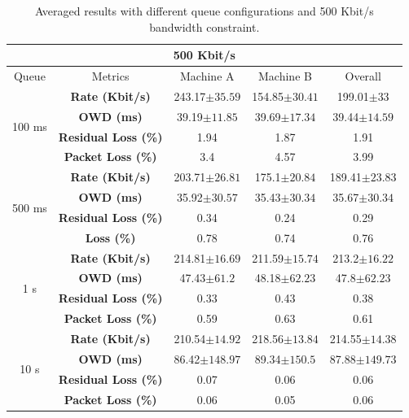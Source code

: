 \begin{table}[h]
\begin{center}
\begin{tabular}{ |c|c|c|c|c| }
\hline
\multicolumn{5}{|c|}{\textbf{500 Kbit/s}} \\ \hline
 Queue & Metrics & Machine A & Machine B & Overall\\ \hline
\multirow{4}{*}{100 ms} & \textbf{Rate (Kbit/s)} & 243.17$\pm35.59$ & 154.85$\pm30.41$ & 199.01$\pm33$\\ \cline{2-5}
 & \textbf{OWD (ms)} &  39.19$\pm11.85$ & 39.69$\pm17.34$ & 39.44$\pm14.59$ \\ \cline{2-5}
 & \textbf{Residual Loss (\%)} & 1.94 & 1.87 & 1.91 \\ \cline{2-5}
 & \textbf{Packet Loss (\%)} & 3.4 & 4.57 & 3.99 \\ \hline
\multirow{4}{*}{500 ms} & \textbf{Rate (Kbit/s)} & 203.71$\pm26.81$ & 175.1$\pm20.84$ & 189.41$\pm23.83$\\ \cline{2-5}
 & \textbf{OWD (ms)} & 35.92$\pm30.57$ & 35.43$\pm30.34$ & 35.67$\pm30.34$ \\ \cline{2-5}
 & \textbf{Residual Loss (\%)} & 0.34 & 0.24 & 0.29 \\ \cline{2-5}
 & \textbf{Loss (\%)} & 0.78 & 0.74 & 0.76 \\ \hline
\multirow{4}{*}{1 s} & \textbf{Rate (Kbit/s)} & 214.81$\pm16.69$ & 211.59$\pm15.74$ & 213.2$\pm16.22$\\ \cline{2-5}
 & \textbf{OWD (ms)} & 47.43$\pm61.2$ & 48.18$\pm62.23$ & 47.8$\pm62.23$ \\ \cline{2-5}
 & \textbf{Residual Loss (\%)} & 0.33 & 0.43 & 0.38 \\ \cline{2-5}
 & \textbf{Packet Loss (\%)} & 0.59 & 0.63 & 0.61 \\ \hline
\multirow{4}{*}{10 s} & \textbf{Rate (Kbit/s)} & 210.54$\pm14.92$ & 218.56$\pm13.84$ & 214.55$\pm14.38$\\ \cline{2-5}
 & \textbf{OWD (ms)} & 86.42$\pm148.97$ & 89.34$\pm150.5$ & 87.88$\pm149.73$ \\ \cline{2-5}
 & \textbf{Residual Loss (\%)} & 0.07 & 0.06 & 0.06 \\ \cline{2-5}
 & \textbf{Packet Loss (\%)} & 0.06 & 0.05 & 0.06 \\ \hline
\end{tabular}
    \caption[Averaged results with different queue configurations and 500 Kbit/s bandwidth constraint]{Averaged results with different queue configurations and 500 Kbit/s bandwidth constraint.}
    \label{fig:500kbit_queue}
\end{center}
\end{table}

